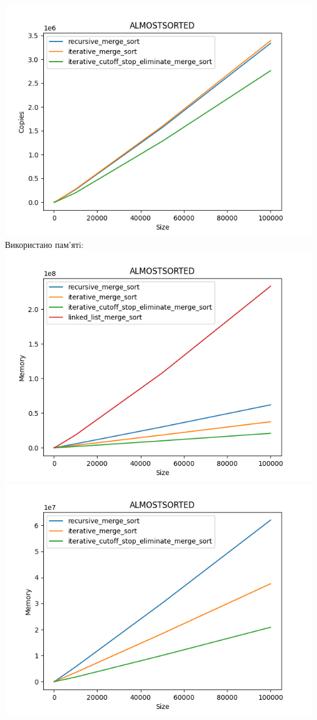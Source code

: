 \documentclass{article}
\begin{document}
        \includegraphics[scale=0.5]{almostsorted_Copies_3_sorts_6_numbers_50_100to100000.png}
    \newline
    Використано пам’ятi:
    \newline
        \includegraphics[scale=0.5]{almostsorted_Memory_4_sorts_6_numbers_50_100to100000.png}
        \includegraphics[scale=0.5]{almostsorted_Memory_3_sorts_6_numbers_50_100to100000.png}
    \newpage
\end{document}
